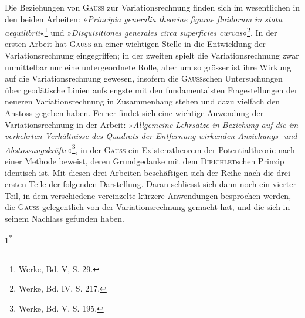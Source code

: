 \clearpage\begingroup\NoSourceHead{}
\renewcommand{\thefootnote}{\arabic{footnote})}\setcounter{footnote}{0}
\noindent\hspace*{\parindent}Die Beziehungen von \textsc{Gauss} zur Variationsrechnung finden sich im wesentlichen
in den beiden Arbeiten: »\textit{Principia generalia theoriae figurae fluidorum in
statu aequilibrii}«\footnote{Werke, Bd. V, S. 29.} und »\textit{Disquisitiones generales circa superficies curvas}«\footnote{Werke, Bd. IV, S. 217.}. In
der ersten Arbeit hat \textsc{Gauss}  an einer wichtigen Stelle in die
Entwicklung der Variationsrechnung eingegriffen; in der zweiten spielt die
Variationsrechnung zwar unmittelbar nur eine untergeordnete Rolle, aber um
so grösser ist ihre  Wirkung auf die Variationsrechnung gewesen,
insofern die \textsc{Gauss}schen Untersuchungen über geodätische Linien aufs engste
mit den fundamentalsten Fragestellungen der neueren Variationsrechnung in
Zusammenhang stehen und dazu vielfach den Anstoss gegeben haben. Ferner
findet sich eine wichtige Anwendung der Variationsrechnung in der Arbeit:
»\textit{Allgemeine Lehrsätze in Beziehung auf die im verkehrten Verhältnisse des Quadrats
der Entfernung wirkenden Anziehungs- und Abstossungskräfte}«\footnote{Werke, Bd. V, S. 195.}, in der \textsc{Gauss}
ein Existenztheorem der Potentialtheorie nach einer Methode beweist, deren
Grundgedanke mit dem \textsc{Dirichlet}schen Prinzip identisch ist. Mit diesen drei
Arbeiten beschäftigen sich der Reihe nach die drei ersten Teile der folgenden
Darstellung. Daran schliesst sich dann noch ein vierter Teil, in dem verschiedene
vereinzelte kürzere Anwendungen besprochen werden, die \textsc{Gauss}
gelegentlich von der Variationsrechnung gemacht hat, und die sich in seinem
Nachlass gefunden haben.
\par\smallskip\noindent\hfill{\small 1\textsuperscript{*}}\par
\clearpage\endgroup
